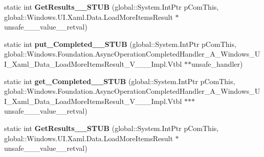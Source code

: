 \begin{DoxyCompactItemize}
static int {\bfseries Get\+Results\+\_\+\+\_\+\+S\+T\+UB} (global\+::\+System.\+Int\+Ptr p\+Com\+This, global\+::\+Windows.\+U\+I.\+Xaml.\+Data.\+Load\+More\+Items\+Result $\ast$unsafe\+\_\+\+\_\+\+\_\+value\+\_\+\+\_\+retval)
\item 
\mbox{\label{struct_windows_1_1_foundation_1_1_i_async_operation___a___windows___u_i___xaml___data___load_mor4757a93b106839c8518b7060ad515b5e_a8b85c3856664b162b19f59bbc3eb9290}} 
static int {\bfseries put\+\_\+\+Completed\+\_\+\+\_\+\+S\+T\+UB} (global\+::\+System.\+Int\+Ptr p\+Com\+This, global\+::\+Windows.\+Foundation.\+Async\+Operation\+Completed\+Handler\+\_\+\+A\+\_\+\+Windows\+\_\+\+U\+I\+\_\+\+Xaml\+\_\+\+Data\+\_\+\+Load\+More\+Items\+Result\+\_\+\+V\+\_\+\+\_\+\+\_\+\+Impl.\+Vtbl $\ast$$\ast$unsafe\+\_\+handler)
\item 
\mbox{\label{struct_windows_1_1_foundation_1_1_i_async_operation___a___windows___u_i___xaml___data___load_mor4757a93b106839c8518b7060ad515b5e_a471e76cd0c4cdcbcdfb3254bba41c7b6}} 
static int {\bfseries get\+\_\+\+Completed\+\_\+\+\_\+\+S\+T\+UB} (global\+::\+System.\+Int\+Ptr p\+Com\+This, global\+::\+Windows.\+Foundation.\+Async\+Operation\+Completed\+Handler\+\_\+\+A\+\_\+\+Windows\+\_\+\+U\+I\+\_\+\+Xaml\+\_\+\+Data\+\_\+\+Load\+More\+Items\+Result\+\_\+\+V\+\_\+\+\_\+\+\_\+\+Impl.\+Vtbl $\ast$$\ast$$\ast$unsafe\+\_\+\+\_\+\+\_\+value\+\_\+\+\_\+retval)
\item 
\mbox{\label{struct_windows_1_1_foundation_1_1_i_async_operation___a___windows___u_i___xaml___data___load_mor4757a93b106839c8518b7060ad515b5e_aeff4a35de12fc3007a84cc50f4124ea3}} 
static int {\bfseries Get\+Results\+\_\+\+\_\+\+S\+T\+UB} (global\+::\+System.\+Int\+Ptr p\+Com\+This, global\+::\+Windows.\+U\+I.\+Xaml.\+Data.\+Load\+More\+Items\+Result $\ast$unsafe\+\_\+\+\_\+\+\_\+value\+\_\+\+\_\+retval)
\end{DoxyCompactItemize}
